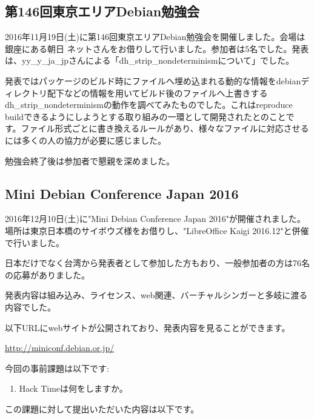 \documentclass[mingoth,a4paper]{jsarticle}
\begin{document}

\subsection{第146回東京エリアDebian勉強会}

2016年11月19日(土)に第146回東京エリアDebian勉強会を開催しました。会場は銀座にある朝日
ネットさんをお借りして行いました。参加者は5名でした。発表は、yy\_y\_ja\_jpさんによる「dh\_strip\_nondeterminismについて」でした。

発表ではパッケージのビルド時にファイルへ埋め込まれる動的な情報をdebianディレクトリ配下などの情報を用いてビルド後のファイルへ上書きするdh\_strip\_nondeterminismの動作を調べてみたものでした。これはreproduce buildできるようにしようとする取り組みの一環として開発されたとのことです。ファイル形式ごとに書き換えるルールがあり、様々なファイルに対応させるには多くの人の協力が必要に感じました。

勉強会終了後は参加者で懇親を深めました。


\subsection{Mini Debian Conference Japan 2016}

2016年12月10日(土)に"Mini Debian Conference Japan 2016"が開催されました。場所は東京日本橋のサイボウズ様をお借りし、"LibreOffice Kaigi 2016.12"と併催で行いました。

日本だけでなく台湾から発表者として参加した方もおり、一般参加者の方は76名の応募がありました。

発表内容は組み込み、ライセンス、web関連、バーチャルシンガーと多岐に渡る内容でした。

以下URLにwebサイトが公開されており、発表内容を見ることができます。

\url{http://miniconf.debian.or.jp/}



今回の事前課題は以下です:
\begin{enumerate}
  \item Hack Timeは何をしますか。
\end{enumerate}
この課題に対して提出いただいた内容は以下です。
\begin{multicols}{2}
{\small

}
\end{multicols}

\end{document}
